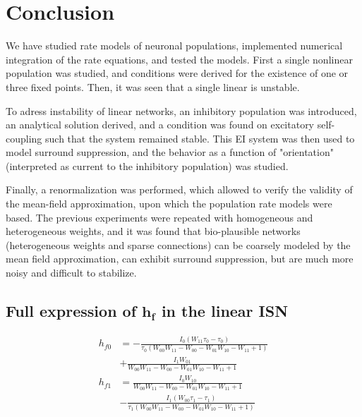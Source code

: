 \documentclass[10pt,conference,compsocconf,a4paper]{IEEEtran}
\renewcommand{\vec}[1]{\boldsymbol{#1}}
\begin{document}
\section{Conclusion}

	We have studied rate models of neuronal populations, implemented numerical integration of the rate equations, and tested the models.
	First a single nonlinear population was studied, and conditions were derived for the existence of one or three fixed points. Then, it was seen that a single linear is unstable.
	
	To adress instability of linear networks, an inhibitory population was introduced, an analytical solution derived, and a condition was found on excitatory self-coupling such that the system remained stable. This EI system was then used to model surround suppression, and the behavior as a function of "orientation" (interpreted as current to the inhibitory population) was studied.

	Finally, a renormalization was performed, which allowed to verify the validity of the mean-field approximation, upon which the population rate models were based. The previous experiments were repeated with homogeneous and heterogeneous weights, and it was found that bio-plausible networks (heterogeneous weights and sparse connections) can be coarsely modeled by the mean field approximation, can exhibit surround suppression, but are much more noisy and difficult to stabilize.



% 
% 

\newpage
\appendix

\subsection{Full expression of $\vec{h_f}$ in the linear ISN}
\label{sec:hf_full}

\begin{equation*} \label{eq:hf_full}
	\begin{aligned}
		h_{f0} &= - \frac{I_{0} \left(W_{11} \tau_{0} - \tau_{0}\right)}{\tau_{0} \left(W_{00} W_{11} - W_{00} - W_{01} W_{10} - W_{11} + 1\right)} \\ &+\frac{I_{1} W_{01}}{W_{00} W_{11} - W_{00} - W_{01} W_{10} - W_{11} + 1}\\
		h_{f1} &= \frac{I_{0} W_{10}}{W_{00} W_{11} - W_{00} - W_{01} W_{10} - W_{11} + 1} \\ &- \frac{I_{1} \left(W_{00} \tau_{1} - \tau_{1}\right)}{\tau_{1} \left(W_{00} W_{11} - W_{00} - W_{01} W_{10} - W_{11} + 1\right)}
	\end{aligned}
\end{equation*}
\end{document}
